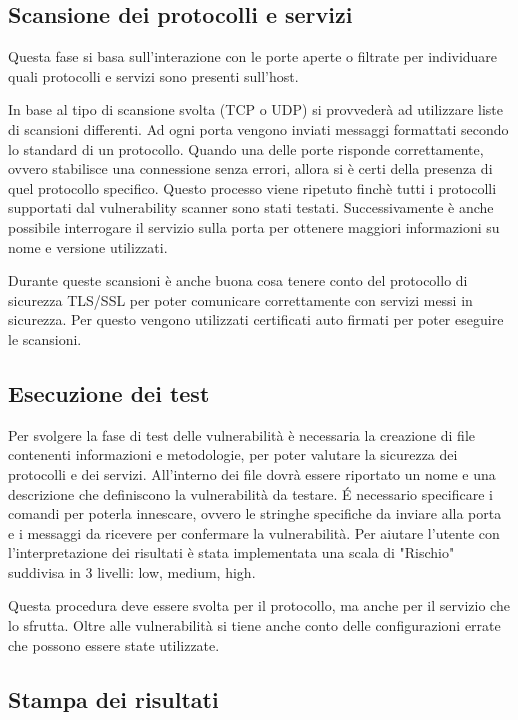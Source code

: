 \documentclass[12pt]{report}
\begin{document}
\subsection{Scansione dei protocolli e servizi}

Questa fase si basa sull'interazione con le porte aperte o filtrate per individuare quali protocolli e servizi sono presenti sull'host.

In base al tipo di scansione svolta (TCP o UDP) si provvederà ad utilizzare liste di scansioni differenti. Ad ogni porta vengono inviati messaggi formattati secondo lo standard di un protocollo. Quando una delle porte risponde correttamente, ovvero stabilisce una connessione senza errori, allora si è certi della presenza di quel protocollo specifico. Questo processo viene ripetuto finchè tutti i protocolli supportati dal vulnerability scanner sono stati testati. Successivamente è anche possibile interrogare il servizio sulla porta per ottenere maggiori informazioni su nome e versione utilizzati.

Durante queste scansioni è anche buona cosa tenere conto del protocollo di sicurezza TLS/SSL per poter comunicare correttamente con servizi messi in sicurezza. Per questo vengono utilizzati certificati auto firmati per poter eseguire le scansioni.

\subsection{Esecuzione dei test}

Per svolgere la fase di test delle vulnerabilità è necessaria la creazione di file contenenti informazioni e metodologie, per poter valutare la sicurezza dei protocolli e dei servizi. All'interno dei file dovrà essere riportato un nome e una descrizione che definiscono la vulnerabilità da testare. \'{E} necessario specificare i comandi per poterla innescare, ovvero le stringhe specifiche da inviare alla porta e i messaggi da ricevere per confermare la vulnerabilità. Per aiutare l'utente con l'interpretazione dei risultati è stata implementata una scala di "Rischio" suddivisa in 3 livelli: low, medium, high.

Questa procedura deve essere svolta per il protocollo, ma anche per il servizio che lo sfrutta. Oltre alle vulnerabilità si tiene anche conto delle configurazioni errate che possono essere state utilizzate.

\subsection{Stampa dei risultati}
\end{document}
